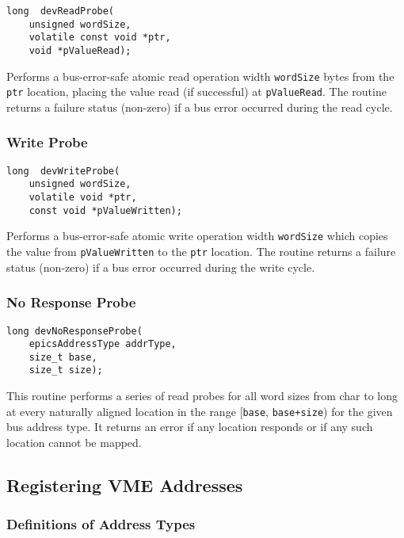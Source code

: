 \begin{verbatim}
long  devReadProbe(
    unsigned wordSize,
    volatile const void *ptr,
    void *pValueRead);
\end{verbatim}

Performs a bus-error-safe atomic read operation width \verb|wordSize| bytes from the \verb|ptr| location, placing the value read (if 
successful) at \verb|pValueRead|. The routine returns a failure status (non-zero) if a bus error occurred during the read cycle.

\subsubsection{Write Probe}

\begin{verbatim}
long  devWriteProbe(
    unsigned wordSize,
    volatile void *ptr,
    const void *pValueWritten);
\end{verbatim}

Performs a bus-error-safe atomic write operation width \verb|wordSize| which copies the value from \verb|pValueWritten| to the 
\verb|ptr| location. The routine returns a failure status (non-zero) if a bus error occurred during the write cycle.

\subsubsection{No Response Probe}

\begin{verbatim}
long devNoResponseProbe(
    epicsAddressType addrType,
    size_t base,
    size_t size);
\end{verbatim}

This routine performs a series of read probes for all word sizes from char to long at every naturally aligned location in the 
range [\verb|base|, \verb|base+size|) for the given bus address type. It returns an error if any location responds or if any such 
location cannot be mapped.

\subsection{Registering VME Addresses}

\subsubsection{Definitions of Address Types}

